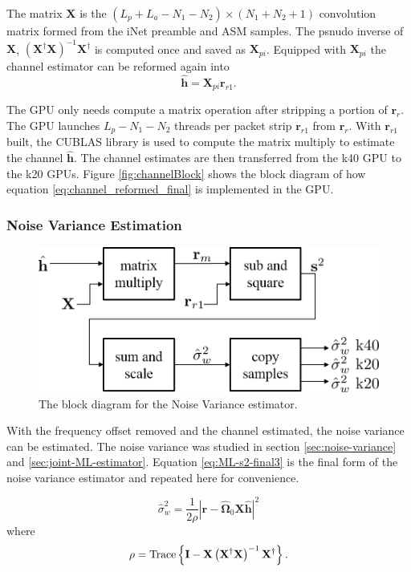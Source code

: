The matrix $\mathbf{X}$ is the $(L_p+L_a-N_1-N_2)\times (N_1+N_2+1)$ convolution matrix
formed from the iNet preamble and ASM samples. 
The psnudo inverse of $\mathbf{X}$, $\left( \mathbf{X}^\dag\mathbf{X} \right)^{-1} \mathbf{X}^\dag$ is computed once and saved as $\mathbf{X}_{pi}$.
Equipped with $\mathbf{X}_{pi}$ the channel estimator can be reformed again into
\begin{equation}
	\hat{\mathbf{h}} = \mathbf{X}_{pi} \mathbf{r}_{r1}.
\label{eq:channel_reformed_final}
\end{equation}

The GPU only needs compute a matrix operation after stripping a portion of $\mathbf{r}_r$.
The GPU launches $L_p-N_1-N_2$ threads per packet strip $\mathbf{r}_{r1}$ from $\mathbf{r}_r$.
With $\mathbf{r}_{r1}$ built, the CUBLAS library is used to compute the matrix multiply to estimate the channel $\hat{\mathbf{h}}$.
The channel estimates are then transferred from the k40 GPU to the k20 GPUs.
Figure \ref{fig:channelBlock} shows the block diagram of how equation \eqref{eq:channel_reformed_final} is implemented in the GPU.

\subsubsection{Noise Variance Estimation}
\begin{figure}
	\centering\includegraphics[width=\textwidth/10*8]{figures/gpu/noiseBlock.png}
	\caption{The block diagram for the Noise Variance estimator.}
	\label{fig:noiseBlock}
\end{figure}
With the frequency offset removed and the channel estimated, the noise variance can be estimated.
The noise variance was studied in section \ref{sec:noise-variance} and \ref{sec:joint-ML-estimator}.
Equation \eqref{eq:ML-s2-final3} is the final form of the noise variance estimator and repeated here for convenience.

\begin{equation}
	\hat{\sigma}_w^2 = \frac{1}{2\rho} \left| \mathbf{r}-\hat{\boldsymbol{\Omega}}_0\mathbf{X}\hat{\mathbf{h}}\right|^2
	\label{eq:jeff-ML-s2-final3}
\end{equation}
where
\begin{equation}
	\rho = {\rm Trace} \left\{ \mathbf{I} -  \mathbf{X}\left(\mathbf{X}^\dag\mathbf{X}\right)^{-1}\mathbf{X}^\dag \right\}.
\end{equation}

